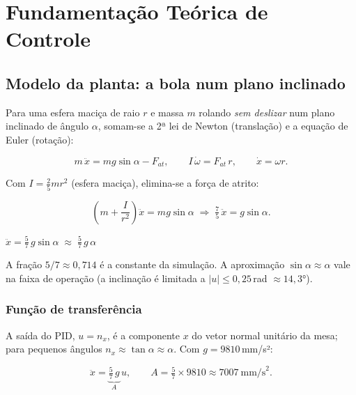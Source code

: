 \documentclass[11pt,a4paper,oneside]{article}
\begin{document}
\section{Fundamentação Teórica de Controle}

\subsection{Modelo da planta: a bola num plano inclinado}

Para uma esfera maciça de raio $r$ e massa $m$ rolando \emph{sem deslizar} num
plano inclinado de ângulo $\alpha$, somam-se a 2ª lei de Newton (translação) e a
equação de Euler (rotação):

\begin{equation}
  m\,\ddot{x} = m g \sin\alpha - F_{at}, \qquad
  I\,\dot\omega = F_{at}\,r, \qquad \dot{x} = \omega r .
\end{equation}

Com $I = \tfrac{2}{5}m r^2$ (esfera maciça), elimina-se a força de atrito:

\begin{equation}
  \left(m + \frac{I}{r^2}\right)\ddot{x} = m g \sin\alpha
  \;\Longrightarrow\; \tfrac{7}{5}\,\ddot{x} = g\sin\alpha .
\end{equation}

\begin{keybox}
$\displaystyle \ddot{x} = \frac{5}{7}\, g \sin\alpha \;\approx\; \frac{5}{7}\, g\,\alpha$
\end{keybox}

A fração $5/7\approx 0{,}714$ é a constante  da simulação. A
aproximação $\sin\alpha\approx\alpha$ vale na faixa de operação (a inclinação é
limitada a $|u|\le 0{,}25$\,rad $\approx 14{,}3°$).

\subsubsection{Função de transferência}

A saída do PID, $u=n_x$, é a componente $x$ do vetor normal unitário da mesa;
para pequenos ângulos $n_x\approx\tan\alpha\approx\alpha$. Com $g=9810$\,mm/s²:

\begin{equation}
  \ddot{x} = \underbrace{\tfrac{5}{7}\,g}_{A}\,u,
  \qquad A = \tfrac{5}{7}\times 9810 \approx 7007\ \text{mm/s}^2 .
\end{equation}
\end{document}
